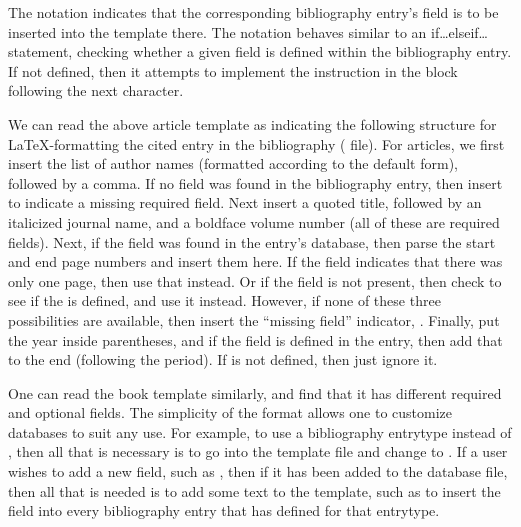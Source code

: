 \documentclass[letterpaper,10pt,english]{sphinxmanual}
\begin{document}
The  notation indicates that the corresponding bibliography entry’s field is to be inserted into the template there. The \sphinxcode{\sphinxupquote{{[}...\textbar{}...{]}}} notation behaves similar to an if…elseif… statement, checking whether a given field is defined within the bibliography entry. If not defined, then it attempts to implement the instruction in the block following the next \sphinxcode{\sphinxupquote{\textbar{}}} character.

We can read the above article template as indicating the following structure for LaTeX-formatting the cited entry in the bibliography ( file). For articles, we first insert the list of author names (formatted according to the default form), followed by a comma. If no  field was found in the bibliography entry, then insert  to indicate a missing required field. Next insert a quoted title, followed by an italicized journal name, and a boldface volume number (all of these are required fields). Next, if the  field was found in the entry’s database, then parse the start and end page numbers and insert them here. If the  field indicates that there was only one page, then use that instead. Or if the  field is not present, then check to see if the  is defined, and use it instead. However, if none of these three possibilities are available, then insert the “missing field” indicator, . Finally, put the year inside parentheses, and if the  field is defined in the entry, then add that to the end (following the period). If  is not defined, then just ignore it.

One can read the book template similarly, and find that it has different required and optional fields. The simplicity of the format allows one to customize databases to suit any use. For example, to use a bibliography entrytype  instead of , then all that is necessary is to go into the template file and change  to . If a user wishes to add a new field, such as , then if it has been added to the  database file, then all that is needed is to add some text to the template, such as  to insert the field into every bibliography entry that has  defined for that entrytype.
\end{document}
